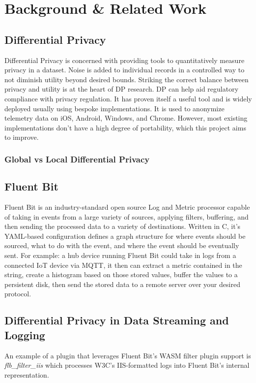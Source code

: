 \chapter{Background \& Related Work\label{chap:background}}

\section{Differential Privacy}

Differential Privacy is concerned with providing tools to quantitatively measure privacy in a dataset. Noise is added to individual records in a controlled way to not diminish utility beyond desired bounds.\cite{WhatisDifferentialPrivacy} Striking the correct balance between privacy and utility is at the heart of DP research.\cite{Dwork2013} DP can help aid regulatory compliance with privacy regulation. It has proven itself a useful tool and is widely deployed usually using bespoke implementations. It is used to anonymize telemetry data on iOS, Android, Windows, and Chrome.\cite{Maranon,markdefalco_2020} However, most existing implementations don't have a high degree of portability, which this project aims to improve.

\subsection{Global vs Local Differential Privacy}

\section{Fluent Bit}
Fluent Bit is an industry-standard open source Log and Metric processor capable of taking in events from a large variety of sources, applying filters, buffering, and then sending the processed data to a variety of destinations.\cite{What-is-Fluent-Bit} Written in C, it's YAML-based configuration defines a graph structure for where events should be sourced, what to do with the event, and where the event should be eventually sent. For example: a hub device running Fluent Bit could take in logs from a connected IoT device via MQTT, it then can extract a metric contained in the string, create a histogram based on those stored values, buffer the values to a persistent disk, then send the stored data to a remote server over your desired protocol.
\section{Differential Privacy in Data Streaming and Logging}
An example of a plugin that leverages Fluent Bit's WASM filter plugin support is \textit{flb\_filter\_iis}\cite{Ortega} which processes W3C's IIS-formatted logs into Fluent Bit's internal representation.

